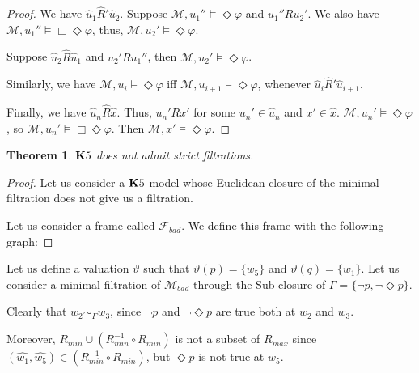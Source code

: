 \documentclass[a4paper]{article}
\theoremstyle{defin}
\theoremstyle{theorem}
\newtheorem{theorem}{Theorem}
\theoremstyle{prop}
\theoremstyle{lemma}
\theoremstyle{ex}
\theoremstyle{col}
\begin{document}
\begin{proof}
  We have $\hat{u}_1 \widehat{R}' \hat{u}_2$. Suppose $\mathcal{M}, u_1'' \models \Diamond \varphi$ and $u_1'' R u_2'$.
  We also have $\mathcal{M}, u_1'' \models \Box \Diamond \varphi$, thus, $\mathcal{M}, u_2' \models \Diamond \varphi$.

  Suppose $\hat{u}_2 \widehat{R} \hat{u}_1$ and $u_2' R u_1''$, then $\mathcal{M}, u_2' \models \Diamond \varphi$.

  Similarly, we have $\mathcal{M}, u_i \models \Diamond \varphi$ iff $\mathcal{M}, u_{i + 1} \models \Diamond \varphi$, whenever $\hat{u}_i \widehat{R}' \hat{u}_{i + 1}$.

  Finally, we have $\hat{u}_n \widehat{R} \hat{x}$. Thus, $u_n' R x'$ for some $u_n' \in \hat{u}_n$ and $x' \in \hat{x}$. $\mathcal{M}, u_n' \models \Diamond \varphi$, so $\mathcal{M}, u_n' \models \Box \Diamond \varphi$. Then $\mathcal{M}, x' \models \Diamond \varphi$.
\end{proof}

\begin{theorem}\label{sad}
  ${\bf K}5$ does not admit strict filtrations.
\end{theorem}

\begin{proof}
  Let us consider a ${\bf K}5$ model whose Euclidean closure of the minimal filtration does not give us a filtration.

  Let us consider a frame called $\mathcal{F}_{bad}$. We define this frame with the following graph:

\vspace{\baselineskip}

\end{proof}

Let us define a valuation $\vartheta$ such that $\vartheta(p) = \{ w_5\}$ and $\vartheta(q) = \{ w_1\}$. Let us consider a minimal filtration of $\mathcal{M}_{bad}$ through the Sub-closure of $\Gamma = \{ \neg p, \neg \Diamond p\}$.

Clearly that $w_2 \sim_{\Gamma} w_3$, since $\neg p$ and $\neg \Diamond p$ are true both at $w_2$ and $w_3$.

Moreover, $R_{min} \cup (R_{min}^{-1} \circ R_{min})$ is not a subset of $R_{max}$ since $(\hat{w_1}, \hat{w_5}) \in (R_{min}^{-1} \circ R_{min})$, but $\Diamond p$ is not true at $w_5$.
\end{document}
